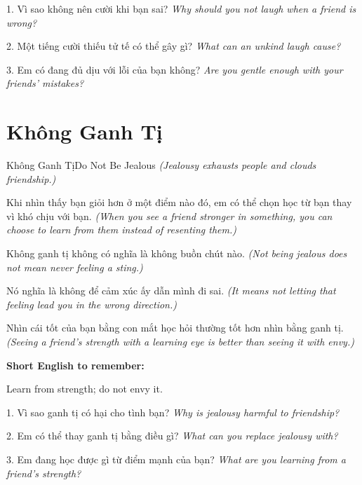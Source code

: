 \begin{tuhocnhanh}
1. Vì sao không nên cười khi bạn sai? \textit{Why should you not laugh when a friend is wrong?}

2. Một tiếng cười thiếu tử tế có thể gây gì? \textit{What can an unkind laugh cause?}

3. Em có đang đủ dịu với lỗi của bạn không? \textit{Are you gentle enough with your friends' mistakes?}
\end{tuhocnhanh}
\ngancach

\section{Không Ganh Tị}
\begin{truyen}{Không Ganh Tị}{Do Not Be Jealous}
\textit{(Jealousy exhausts people and clouds friendship.)}

Khi nhìn thấy bạn giỏi hơn ở một điểm nào đó, em có thể chọn học từ bạn thay vì khó chịu với bạn.
\textit{(When you see a friend stronger in something, you can choose to learn from them instead of resenting them.)}

Không ganh tị không có nghĩa là không buồn chút nào.
\textit{(Not being jealous does not mean never feeling a sting.)}

Nó nghĩa là không để cảm xúc ấy dẫn mình đi sai.
\textit{(It means not letting that feeling lead you in the wrong direction.)}
\end{truyen}

\begin{baihoc}
Nhìn cái tốt của bạn bằng con mắt học hỏi thường tốt hơn nhìn bằng ganh tị.
\textit{(Seeing a friend's strength with a learning eye is better than seeing it with envy.)}
\end{baihoc}

\begin{ghinhoanh}
\textbf{Short English to remember:}

Learn from strength; do not envy it.

\end{ghinhoanh}

\begin{tuhocnhanh}
1. Vì sao ganh tị có hại cho tình bạn? \textit{Why is jealousy harmful to friendship?}

2. Em có thể thay ganh tị bằng điều gì? \textit{What can you replace jealousy with?}

3. Em đang học được gì từ điểm mạnh của bạn? \textit{What are you learning from a friend's strength?}
\end{tuhocnhanh}
\ngancach

